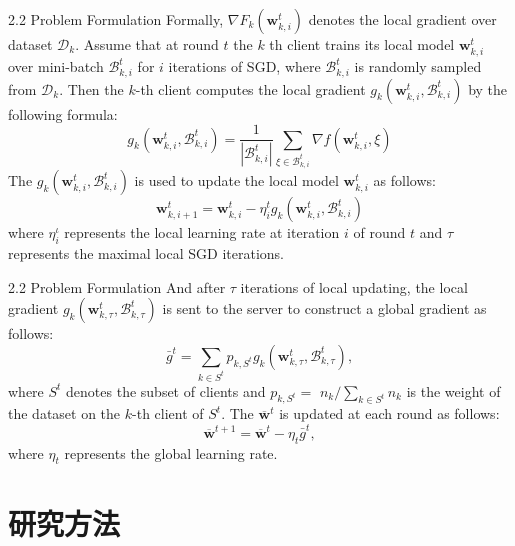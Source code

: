 \documentclass{sintefbeamer}
\theoremstyle{definition}
\begin{document}
\begin{frame}{2.2 Problem Formulation}
Formally, $\nabla F_k\left(\mathbf{w}_{k, i}^t\right)$ denotes the local gradient over dataset $\mathcal{D}_k$. Assume that at round $t$ the $k$ th client trains its local model $\mathbf{w}_{k, i}^t$ over mini-batch $\mathcal{B}_{k, i}^t$ for $i$ iterations of SGD, where $\mathcal{B}_{k, i}^t$ is randomly sampled from $\mathcal{D}_k$. Then the $k$-th client computes the local gradient $g_k\left(\mathbf{w}_{k, i}^t, \mathcal{B}_{k, i}^t\right)$ by the following formula:
$$
g_k\left(\mathbf{w}_{k, i}^t, \mathcal{B}_{k, i}^t\right)=\frac{1}{\left|\mathcal{B}_{k, i}^t\right|} \sum_{\xi \in \mathcal{B}_{k, i}^t} \nabla f\left(\mathbf{w}_{k, i}^t, \xi\right)
$$
The $g_k\left(\mathbf{w}_{k, i}^t, \mathcal{B}_{k, i}^t\right)$ is used to update the local model $\mathbf{w}_{k, i}^t$ as follows:
$$
\mathbf{w}_{k, i+1}^t=\mathbf{w}_{k, i}^t-\eta_i^t g_k\left(\mathbf{w}_{k, i}^t, \mathcal{B}_{k, i}^t\right)
$$
where $\eta_i^\iota$ represents the local learning rate at iteration $i$ of round $t$ and $\tau$ represents the maximal local SGD iterations. 

\end{frame}
\begin{frame}{2.2 Problem Formulation}
And after $\tau$ iterations of local updating, the local gradient $g_k\left(\mathbf{w}_{k, \tau}^t, \mathcal{B}_{k, \tau}^t\right)$ is sent to the server to construct a global gradient as follows:
$$
\bar{g}^t=\sum_{k \in S^t} p_{k, S^t} g_k\left(\mathbf{w}_{k, \tau}^t, \mathcal{B}_{k, \tau}^t\right),
$$
where $S^t$ denotes the subset of clients and $p_{k, S^t}=$ $n_k / \sum_{k \in S^t} n_k$ is the weight of the dataset on the $k$-th client of $S^t$. The $\overline{\mathbf{w}}^t$ is updated at each round as follows:
$$
\overline{\mathbf{w}}^{t+1}=\overline{\mathbf{w}}^t-\eta_t \bar{g}^t,
$$
where $\eta_t$ represents the global learning rate.
\end{frame}

\section{研究方法}
\end{document}
